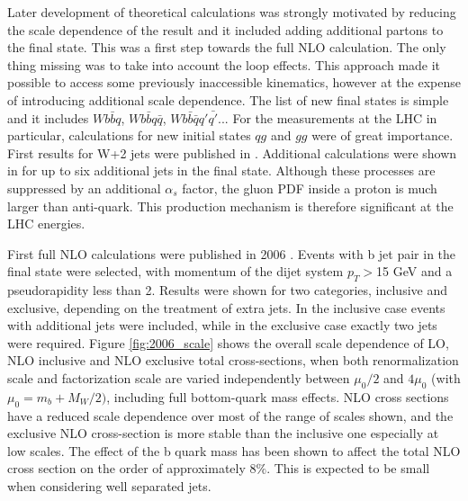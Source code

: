 \par Later development of theoretical calculations was strongly motivated by reducing the scale dependence of the result and it included adding additional partons to the final state. This was a first step towards the full NLO calculation. The only thing missing was to take into account the loop effects. This approach made it possible to access some previously inaccessible kinematics, however at the expense of introducing additional scale dependence. The list of new final states is simple and it includes $Wb\bar{b}q$, $Wb\bar{b}q\bar{q}$, $Wb\bar{b}\bar{q}q'\bar{q'}$... For the measurements at the LHC in particular, calculations for new initial states $qg$ and $gg$ were of great importance. First results for W+2 jets were published in \cite{Ellis:1998fv}. Additional calculations were shown in \cite{Mangano:2001xp} for up to six additional jets in the final state. Although these processes are suppressed by an additional $\alpha_s$ factor, the gluon PDF inside a proton is much larger than anti-quark. This production mechanism is therefore significant at the LHC energies. 
\par First full NLO calculations were published in 2006 \cite{FebresCordero:2006sj}. 
Events with b jet pair in the final state were selected, with momentum of the dijet system $p_T>$15 GeV  and a pseudorapidity less than 2. Results were shown for two categories, inclusive and exclusive, depending on the treatment of extra jets. In the inclusive case events with additional jets were included, while in the exclusive case exactly two jets were required.
Figure \ref{fig:2006_scale} shows the overall scale dependence of LO, NLO inclusive and NLO exclusive total cross-sections, when both renormalization scale and factorization scale are varied independently between $\mu_0/2$ and $4\mu_0$ (with $\mu_0 = m_b + M_W /2)$, including full bottom-quark mass effects. NLO cross sections have a reduced scale dependence over most of the range of scales shown, and the exclusive NLO cross-section is more stable than the inclusive one especially at low scales.
The effect of the b quark mass has been shown to affect the total NLO cross section on the order of approximately $8\%$. This is expected to be small when considering well separated jets.
